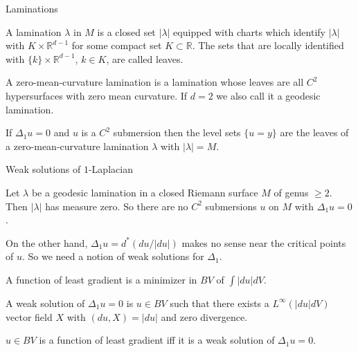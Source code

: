 \documentclass[10pt]{beamer}
\newcommand{\RR}{\mathbb{R}}
\begin{document}
\begin{frame}{Laminations}
\begin{definition}
A lamination $\lambda$ in $M$ is a closed set $|\lambda|$ equipped with charts which identify $|\lambda|$ with $K \times \RR^{d - 1}$ for some compact set $K \subset \RR$.
The sets that are locally identified with $\{k\} \times \RR^{d - 1}$, $k \in K$, are called leaves.
\end{definition}

\pause

\begin{definition}
A zero-mean-curvature lamination is a lamination whose leaves are all $C^2$ hypersurfaces with zero mean curvature.
If $d = 2$ we also call it a geodesic lamination.
\end{definition}

\pause

\begin{theorem}
If $\Delta_1 u = 0$ and $u$ is a $C^2$ submersion then the level sets $\{u = y\}$ are the leaves of a zero-mean-curvature lamination $\lambda$ with $|\lambda| = M$.
\end{theorem}
\end{frame}

\begin{frame}{Weak solutions of $1$-Laplacian}
\begin{example}
Let $\lambda$ be a geodesic lamination in a closed Riemann surface $M$ of genus $\geq 2$. Then $|\lambda|$ has measure zero. \pause
So there are no $C^2$ submersions $u$ on $M$ with $\Delta_1 u = 0$.
\end{example}

\pause

On the other hand, $\Delta_1 u = d^*(du/|du|)$ makes no sense near the critical points of $u$.
So we need a notion of weak solutions for $\Delta_1$.

\pause

\begin{definition}
A function of least gradient is a minimizer in $BV$ of $\int |du|dV$. \pause

A weak solution of $\Delta_1 u = 0$ is $u \in BV$ such that there exists a $L^\infty(|du|dV)$ vector field $X$ with $(du, X) = |du|$ and zero divergence.
\end{definition}

\pause

\begin{theorem}
$u \in BV$ is a function of least gradient iff it is a weak solution of $\Delta_1 u = 0$.
\end{theorem}
\end{frame}
\end{document}
